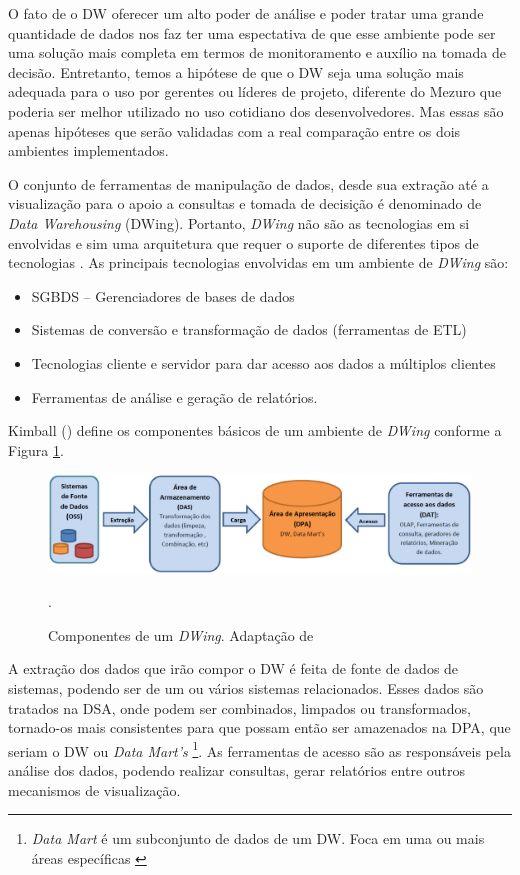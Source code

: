 % 
O fato de o DW oferecer um alto poder de análise e poder tratar uma grande quantidade de dados nos faz ter uma espectativa de que esse ambiente pode ser uma solução mais completa em termos de monitoramento e auxílio na tomada de decisão. Entretanto, temos a hipótese de que o DW seja uma solução mais adequada para o uso por gerentes ou líderes de projeto, diferente do Mezuro que poderia ser melhor utilizado no uso cotidiano dos desenvolvedores. Mas essas são apenas hipóteses que serão validadas com a real comparação entre os dois ambientes implementados.

O conjunto de ferramentas de manipulação de dados, desde sua extração até a visualização para o apoio a consultas e tomada de decisição é denominado de \emph{Data Warehousing} (DWing). Portanto,  \emph{DWing} não são as tecnologias em si envolvidas e sim uma arquitetura que requer o suporte de diferentes tipos de tecnologias \cite{inmon2002}.  As principais tecnologias envolvidas em um ambiente de \emph{DWing} são:


\begin{itemize}
\item SGBDS – Gerenciadores de bases de dados
\item Sistemas de conversão e transformação de dados (ferramentas de ETL)
\item Tecnologias cliente e servidor para dar acesso aos dados a múltiplos clientes
\item Ferramentas de análise e geração de relatórios.
\end{itemize}


Kimball (\citeyear{kimball2002}) define os componentes básicos de um ambiente de \emph{DWing} conforme a Figura \ref{componentesdw}.

 \begin{figure}[!htb]
 	\centering
 		\includegraphics[scale=0.5]{figuras/componentesDW}
 		\caption{Componentes de um \emph{DWing}. Adaptação de \cite{kimball2002}}.
 		\label{componentesdw}
 \end{figure}


 A extração dos dados que irão compor o DW é feita de fonte de dados de sistemas, podendo ser de um ou vários sistemas relacionados. Esses dados são tratados na DSA, onde podem ser combinados, limpados ou transformados, tornado-os mais consistentes para que possam então ser amazenados na DPA, que seriam o DW ou \emph{Data Mart's}
 \footnote{\emph{Data Mart} é um subconjunto de dados de um DW. Foca em uma ou mais áreas específicas \cite{kimball2002}}. 
 As ferramentas de acesso são as responsáveis pela análise dos dados, podendo realizar consultas, gerar relatórios entre outros mecanismos de visualização.

